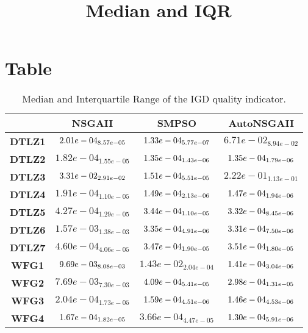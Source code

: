 \documentclass{article}
\title{Median and IQR}
\author{}
\begin{document}
\maketitle
\section{Table}
\begin{table}[!htp]
  \caption{Median and Interquartile Range of the IGD quality indicator.}
  \label{table:IGD}
  \centering
  \begin{scriptsize}
  \begin{tabular}{c|ccc}
      & \textbf{NSGAII} & \textbf{SMPSO} & \textbf{AutoNSGAII} \\\hline
      \textbf{DTLZ1} & $\cellcolor{gray25} 2.01e-04_{8.57e-05} $ & $ \cellcolor{gray95} 1.33e-04_{5.77e-07} $ & $ 6.71e-02_{8.94e-02}$ \\
      \textbf{DTLZ2} & $1.82e-04_{1.55e-05} $ & $ \cellcolor{gray25} 1.35e-04_{1.43e-06} $ & $ \cellcolor{gray95} 1.35e-04_{1.79e-06}$ \\
      \textbf{DTLZ3} & $\cellcolor{gray25} 3.31e-02_{2.91e-02} $ & $ \cellcolor{gray95} 1.51e-04_{5.51e-05} $ & $ 2.22e-01_{1.13e-01}$ \\
      \textbf{DTLZ4} & $1.91e-04_{1.10e-05} $ & $ \cellcolor{gray25} 1.49e-04_{2.13e-06} $ & $ \cellcolor{gray95} 1.47e-04_{1.94e-06}$ \\
      \textbf{DTLZ5} & $4.27e-04_{1.29e-05} $ & $ \cellcolor{gray25} 3.44e-04_{1.10e-05} $ & $ \cellcolor{gray95} 3.32e-04_{8.45e-06}$ \\
      \textbf{DTLZ6} & $1.57e-03_{1.38e-03} $ & $ \cellcolor{gray25} 3.35e-04_{4.91e-06} $ & $ \cellcolor{gray95} 3.31e-04_{7.50e-06}$ \\
      \textbf{DTLZ7} & $4.60e-04_{4.06e-05} $ & $ \cellcolor{gray95} 3.47e-04_{1.90e-05} $ & $ \cellcolor{gray25} 3.51e-04_{1.80e-05}$ \\
      \textbf{WFG1} & $\cellcolor{gray25} 9.69e-03_{8.08e-03} $ & $ 1.43e-02_{2.04e-04} $ & $ \cellcolor{gray95} 1.41e-04_{3.04e-06}$ \\
      \textbf{WFG2} & $7.69e-03_{7.30e-03} $ & $ \cellcolor{gray25} 4.09e-04_{5.41e-05} $ & $ \cellcolor{gray95} 2.98e-04_{1.31e-05}$ \\
      \textbf{WFG3} & $2.04e-04_{1.73e-05} $ & $ \cellcolor{gray25} 1.59e-04_{4.51e-06} $ & $ \cellcolor{gray95} 1.46e-04_{4.53e-06}$ \\
      \textbf{WFG4} & $\cellcolor{gray25} 1.67e-04_{1.82e-05} $ & $ 3.66e-04_{4.47e-05} $ & $ \cellcolor{gray95} 1.30e-04_{5.91e-06}$ \\

\end{tabular}
\end{scriptsize}
\end{table}
\end{document}
